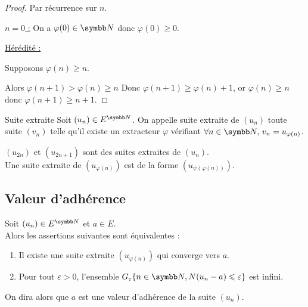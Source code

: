 \begin{proof}
    Par récurrence sur $n$. 

    \uline{$n = 0$ :}
    On a $\varphi(0) \in \N$ donc $\varphi(0) \geqslant 0$.

    \uline{Hérédité :}

    Supposons $\varphi(n) \geqslant n$.

    Alors $\varphi(n + 1) > \varphi(n) \geqslant n$ 
    Donc $\varphi(n + 1) \geqslant \varphi(n) + 1$, or $\varphi(n) \geqslant n$ donc
    $\varphi(n + 1) \geqslant n + 1$.
\end{proof}

\begin{definition}{Suite extraite}{}
    Soit $(u_n) \in E^{\N}$. On appelle suite extraite de $(u_n)$ toute suite 
    $(v_n)$ telle qu'il existe un extracteur $\varphi$ vérifiant 
    $\forall n \in \N, \, v_n = u_{\varphi(n)}$.
\end{definition}

\begin{exemple}
    $(u_{2n})$ et $(u_{2n + 1})$ sont des suites extraites de $(u_n)$. \\

    Une suite extraite de $(u_{\varphi(n)})$ est de la forme $(u_{\psi (\varphi (n))})$.
\end{exemple}

\subsection{Valeur d'adhérence}
\begin{theoreme}{}{}
    Soit $(u_n) \in E^{\N}$ et $a \in E$. \\

    Alors les assertions suivantes sont équivalentes :
    \begin{enumerate}
        \item Il existe une suite extraite $(u_{\varphi(n)})$ qui converge 
            vers $a$.
        \item Pour tout $\varepsilon > 0$, l'ensemble 
            $G_\varepsilon\{n \in \N, N(u_n - a) \leqslant \varepsilon\}$ est infini.
    \end{enumerate}

    On dira alors que $a$ est une valeur d'adhérence de la suite $(u_n)$.
\end{theoreme}


